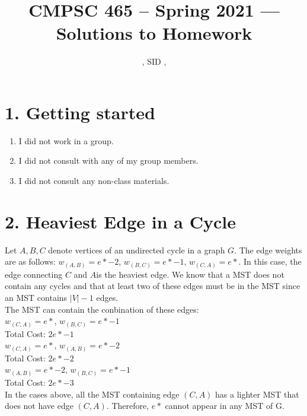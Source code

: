 \documentclass[11pt]{article}
\title{CMPSC 465 -- Spring 2021 --- Solutions to Homework \Homework}
\author{\Name, SID \SID, \texttt{\Login}}
\newenvironment{qparts}{\begin{enumerate}[{(}a{)}]}{\end{enumerate}}
\begin{document}
\maketitle


\section*{1. Getting started}
\begin{qparts}
\item
I did not work in a group.
\item
I did not consult with any of my group members.
\item
I did not consult any non-class materials.
\end{qparts}



\newpage
\section*{2. Heaviest Edge in a Cycle}

Let $A, B, C$ denote vertices of an undirected cycle in a graph $G$. The edge weights are as follows: $w_{(A, B)} = e* - 2$, $w_{(B, C)} = e* - 1$, $w_{(C, A)} = e*$. In this case, the edge connecting $C$ and $A$is the heaviest edge. We know that a MST does not contain any cycles and that at least two of these edges must be in the MST since an MST contains $|V|-1$ edges. \\

The MST can contain the conbination of these edges:\\
$w_{(C, A)} = e*$, $w_{(B, C)} = e* - 1$ \\
Total Cost: $2e*-1$\\
$w_{(C, A)} = e*$, $w_{(A, B)} = e* - 2$ \\
Total Cost: $2e*-2$\\
$w_{(A, B)} = e* - 2$, $w_{(B, C)} = e* - 1$ \\
Total Cost: $2e*-3$\\
 
 In the cases above, all the MST containing edge $(C, A)$ has a lighter MST that does not have edge $(C, A)$. Therefore, $e*$ cannot appear in any MST of G. 


\newpage
\end{document}
